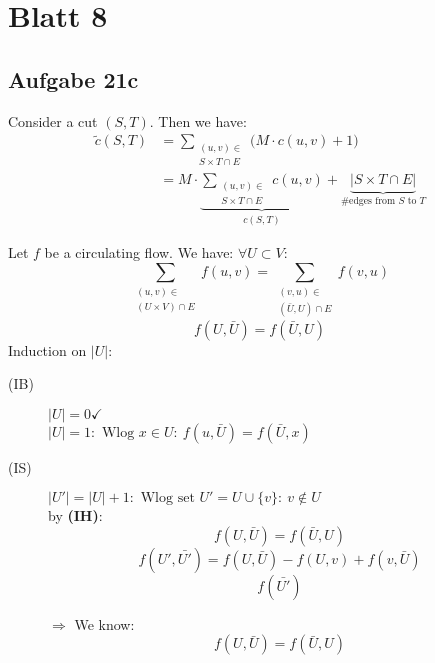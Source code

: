 \documentclass[12pt,oneside,a4paper,parskip=on,fleqn]{scrartcl}
\begin{document}
\section{Blatt 8} %
\label{sec:blatt_8}
	\subsection{Aufgabe 21c} %
	\label{sub:aufgabe_21c}
		Consider a cut $(S,T)$. Then we have:
		\begin{align*}
			\tilde{c}(S,T) &= \sum_{\substack{(u,v)\in\\ S\times T \cap E}} \bigl( M\cdot c(u,v) + 1 \bigr)\\
			&=M\cdot \underbrace{\sum_{\substack{(u,v)\in\\ S\times T \cap E}} c(u,v)}_{c(S,T)} + \underbrace{|S\times T\cap E|}_{\text{\# edges from } S \text{ to } T}
		\end{align*}

	Let $f$ be a circulating flow. We have: $\forall U\subset V:$
	\[
		\sum_{\substack{
				(u,v) \in\\
				(U\times V)\cap E
		}} f(u,v)
		= \sum_{\substack{
				(v,u)\in \\
				(\bar{U},U)\cap E
		}} f(v,u)
	\]
	\[
		f(U,\bar{U}) = f(\bar{U},U)
	\]
	Induction on $|U|:$
	\begin{description}
		\item[(IB)] \(
			|U|=0\checkmark
		\)\\\(
			|U| = 1: \text{ Wlog } x\in U:\ f(u,\bar{U}) = f(\bar{U},x)
		\)
		\item[(IS)] $|U'| = |U| + 1: \text{ Wlog set } U' = U \cup \{v\}:\ v\not\in U$\\
			by \textbf{(IH)}: \[
				f(U,\bar{U}) = f(\bar{U},U)
			\]\[
				f(U',\bar{U'}) = f(U,\bar{U}) - f(U,v) + f(v,\bar{U})
			\]\[
				f(\bar{U'})
			\]

			$\Rightarrow$ We know:
			\[
				f(U,\bar{U}) = f(\bar{U},U)
			\]
	\end{description}
\end{document}
